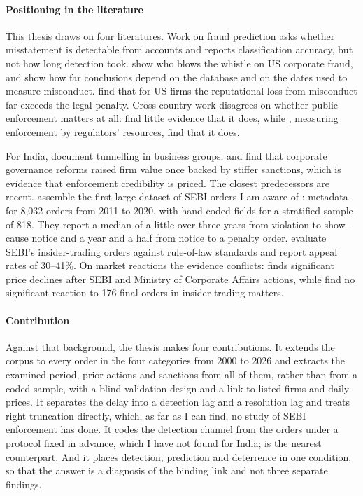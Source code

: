 \documentclass[letterpaper,11pt,leqno]{article}
\begin{document}
\paragraph{Positioning in the literature} This thesis draws on four literatures. Work on fraud prediction \citep{B99,DGLS11,BKLYZ20} asks whether misstatement is detectable from accounts and reports classification accuracy, but not how long detection took. \citet{DMZ10} show who blows the whistle on US corporate fraud, and \citet{KKLM17} show how far conclusions depend on the database and on the dates used to measure misconduct. \citet{KLM08} find that for US firms the reputational loss from misconduct far exceeds the legal penalty. Cross-country work disagrees on whether public enforcement matters at all: \citet{LLS06} find little evidence that it does, while \citet{JR09}, measuring enforcement by regulators' resources, find that it does.

For India, \citet{BMM02} document tunnelling in business groups, and \citet{DK13} find that corporate governance reforms raised firm value once backed by stiffer sanctions, which is evidence that enforcement credibility is priced. The closest predecessors are recent. \citet{DZ22} assemble the first large dataset of SEBI orders I am aware of \citep{ZD22}: metadata for 8,032 orders from 2011 to 2020, with hand-coded fields for a stratified sample of 818. They report a median of a little over three years from violation to show-cause notice and a year and a half from notice to a penalty order. \citet{AKPPS25} evaluate SEBI's insider-trading orders against rule-of-law standards and report appeal rates of 30--41\%. On market reactions the evidence conflicts: \citet{J22} finds significant price declines after SEBI and Ministry of Corporate Affairs actions, while \citet{GPS26} find no significant reaction to 176 final orders in insider-trading matters.

\paragraph{Contribution} Against that background, the thesis makes four contributions. It extends the corpus to every order in the four categories from 2000 to 2026 and extracts the examined period, prior actions and sanctions from all of them, rather than from a coded sample, with a blind validation design and a link to listed firms and daily prices. It separates the delay into a detection lag and a resolution lag and treats right truncation directly, which, as far as I can find, no study of SEBI enforcement has done. It codes the detection channel from the orders under a protocol fixed in advance, which I have not found for India; \citet{DMZ10} is the nearest counterpart. And it places detection, prediction and deterrence in one condition, so that the answer is a diagnosis of the binding link and not three separate findings.
\end{document}
